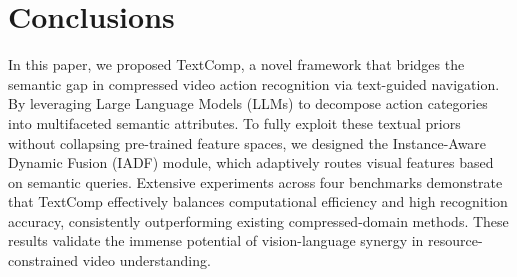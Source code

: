 \documentclass[runningheads]{llncs}
\begin{document}
\section{Conclusions}
\label{sec:conclusion}
In this paper, we proposed TextComp, a novel framework that bridges the semantic gap in compressed video action recognition via text-guided navigation. By leveraging Large Language Models (LLMs) to decompose action categories into multifaceted semantic attributes. To fully exploit these textual priors without collapsing pre-trained feature spaces, we designed the Instance-Aware Dynamic Fusion (IADF) module, which adaptively routes visual features based on semantic queries. Extensive experiments across four benchmarks demonstrate that TextComp effectively balances computational efficiency and high recognition accuracy, consistently outperforming existing compressed-domain methods. These results validate the immense potential of vision-language synergy in resource-constrained video understanding.



\clearpage



\end{document}
